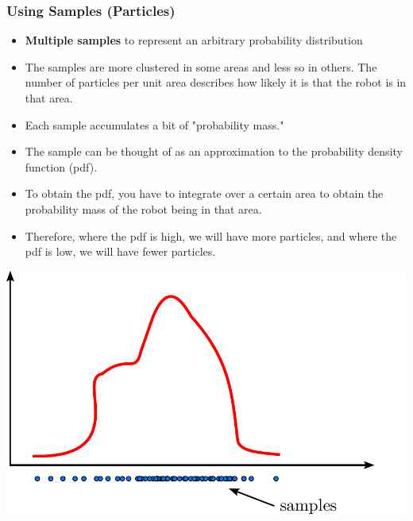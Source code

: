 \begin{frame}
    \frametitle{Using Samples (Particles)}
    \footnotesize
    \begin{itemize}
        \item \textbf{Multiple samples} to represent an arbitrary probability distribution
        \item The samples are more clustered in some areas and less so in others. The number of particles per unit area describes how likely it is that the robot is in that area.
        \item Each sample accumulates a bit of "probability mass."
        \item The sample can be thought of as an approximation to the probability density function (pdf).
        \item To obtain the pdf, you have to integrate over a certain area to obtain the probability mass of the robot being in that area.
        \item Therefore, where the pdf is high, we will have more particles, and where the pdf is low, we will have fewer particles.
    \end{itemize}
    
    \begin{center}
        \includegraphics[width=0.4\columnwidth]{./images/particle_filter/arbitrary_distribution_samples.pdf}
    \end{center}

\end{frame}

